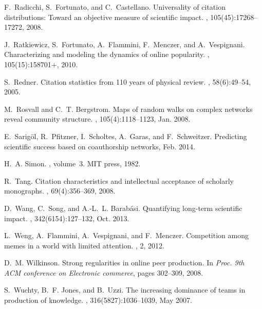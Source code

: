 \documentclass[10pt]{bmc_article}
\begin{document}
\begin{thebibliography}{10}
F.~Radicchi, S.~Fortunato, and C.~Castellano.
\newblock Universality of citation distributions: Toward an objective measure
  of scientific impact.
, 105(45):17268--17272, 2008.

J.~Ratkiewicz, S.~Fortunato, A.~Flammini, F.~Menczer, and A.~Vespignani.
\newblock Characterizing and modeling the dynamics of online popularity.
, 105(15):158701+, 2010.

S.~Redner.
\newblock Citation statistics from 110 years of physical review.
, 58(6):49--54, 2005.

M.~Rosvall and C.~T. Bergstrom.
\newblock Maps of random walks on complex networks reveal community structure.
, 105(4):1118--1123, Jan. 2008.

E.~Sarig\"{o}l, R.~Pfitzner, I.~Scholtes, A.~Garas, and F.~Schweitzer.
\newblock Predicting scientific success based on coauthorship networks, Feb.
  2014.

H.~A. Simon.
, volume~3.
\newblock MIT press, 1982.

R.~Tang.
\newblock Citation characteristics and intellectual acceptance of scholarly
  monographs.
, 69(4):356--369, 2008.

D.~Wang, C.~Song, and A.-L.~L. Barab\'{a}si.
\newblock Quantifying long-term scientific impact.
, 342(6154):127--132, Oct. 2013.

L.~Weng, A.~Flammini, A.~Vespignani, and F.~Menczer.
\newblock Competition among memes in a world with limited attention.
, 2, 2012.

D.~M. Wilkinson.
\newblock Strong regularities in online peer production.
\newblock In {\em Proc. 9th ACM conference on Electronic commerce}, pages
  302--309, 2008.

S.~Wuchty, B.~F. Jones, and B.~Uzzi.
\newblock The increasing dominance of teams in production of knowledge.
, 316(5827):1036--1039, May 2007.

\end{thebibliography}
\end{document}
